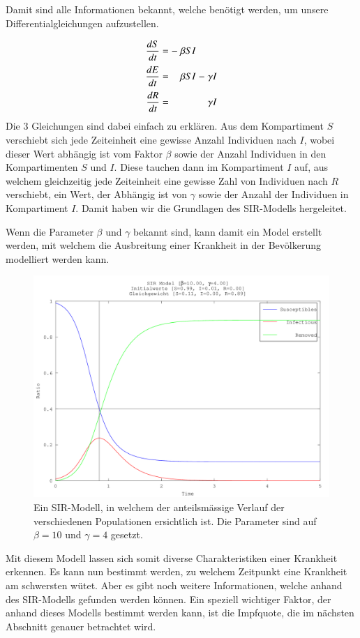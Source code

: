 \begin{refsection}
Damit sind alle Informationen bekannt, welche benötigt werden, um unsere Differentialgleichungen aufzustellen. 
\[
\arraycolsep=1.4pt\def\arraystretch{2.2}
  \begin{array}{rccrcrcr}
   \displaystyle\frac{dS}{dt} & = &-&\beta S I& &        \\
   \displaystyle\frac{dE}{dt} & = & &\beta S I&-&\gamma I\\
   \displaystyle\frac{dR}{dt} & = & &         & &\gamma I
 \end{array}
\]
Die 3 Gleichungen sind dabei einfach zu erklären. 
Aus dem Kompartiment $S$ verschiebt sich jede Zeiteinheit eine gewisse Anzahl Individuen nach $I$, wobei dieser Wert abhängig ist vom Faktor $\beta$ sowie der Anzahl Individuen in den Kompartimenten $S$ und $I$.
Diese tauchen dann im Kompartiment $I$ auf, aus welchem gleichzeitig jede Zeiteinheit eine gewisse Zahl von Individuen nach $R$ verschiebt, ein Wert, der Abhängig ist von $\gamma$ sowie der Anzahl der Individuen in Kompartiment $I$. 
Damit haben wir die Grundlagen des SIR-Modells hergeleitet. 

Wenn die Parameter $\beta$ und $\gamma$ bekannt sind, kann damit ein Model erstellt werden, mit welchem die Ausbreitung einer Krankheit in der Bevölkerung modelliert werden kann.

\begin{figure}[h]
  \centering
  \includegraphics[width=.8\textwidth]{sir/images/SIR}
  \caption[Nullkline]{Ein SIR-Modell, in welchem der anteilsmässige Verlauf der verschiedenen Populationen ersichtlich ist. Die Parameter sind auf $\beta=10$ und $\gamma = 4$ gesetzt. }
  \label{fig:quiver}
\end{figure}

Mit diesem Modell lassen sich somit diverse Charakteristiken einer Krankheit erkennen. 
Es kann nun bestimmt werden, zu welchem Zeitpunkt eine Krankheit am schwersten wütet. 
Aber es gibt noch weitere Informationen, welche anhand des SIR-Modells gefunden werden können.
Ein speziell wichtiger Faktor, der anhand dieses Modells bestimmt werden kann, ist die Impfquote, die im nächsten Abschnitt genauer betrachtet wird.


\end{refsection}
